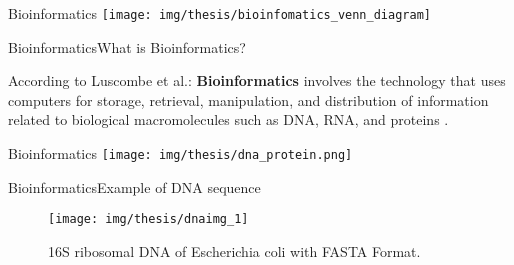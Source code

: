 \documentclass[10pt]{beamer}
\newcommand{\1}{
        	\setbeamertemplate{background}{
        		\texttt{[image: img/1]}
        		\tikz[overlay] \fill[fill opacity=0.75,fill=white] (0,0) rectangle (-\paperwidth,\paperheight);
        	}
}
\begin{document}
\begin{frame}{Bioinformatics}{}
	\centering
	\texttt{[image: img/thesis/bioinfomatics\_venn\_diagram]}
\end{frame}

\begin{frame}{Bioinformatics}{What is Bioinformatics?}

	
	According to Luscombe et al.: \textbf{Bioinformatics} involves the technology that uses computers for storage, retrieval, manipulation, and distribution of information related to biological macromolecules such as DNA, RNA, and proteins \cite{luscombe2001bioinformatics}.
	
\end{frame}


\begin{frame}{Bioinformatics}{}
	\centering
	\texttt{[image: img/thesis/dna\_protein.png]}
\end{frame}

\begin{frame}{Bioinformatics}{Example of DNA sequence}
	\begin{figure}[]
		\centering
		\texttt{[image: img/thesis/dnaimg\_1]}
		\label{img:mot2}
		\caption{16S ribosomal DNA of Escherichia coli with FASTA Format.}
	\end{figure}
\end{frame}

\end{document}
